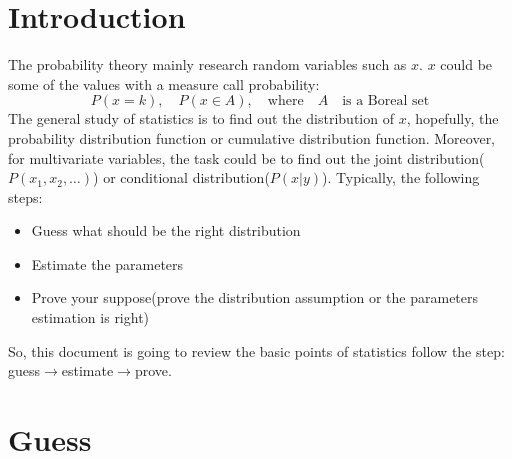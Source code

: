 \documentclass[UTF8]{article} %
\begin{document}
\section{Introduction}
The probability theory mainly research random variables such as $x$. $x$ could be some of the values with a measure call probability:
$$
P(x=k),\quad P(x \in A), \quad\text{where}\quad A \quad\text{is a Boreal set}
$$
The general study of statistics is to find out the distribution of $x$, hopefully, the probability distribution function or cumulative distribution function. Moreover, for multivariate variables, the task could be to find out the joint distribution($P(x_1,x_2,\ldots)$) or conditional distribution($P(x|y)$). Typically, the following steps:
\begin{itemize}
\item Guess what should be the right distribution
\item Estimate the parameters
\item Prove your suppose(prove the distribution assumption or the parameters estimation is right)
\end{itemize}
So, this document is going to review the basic points of statistics follow the step: guess$\rightarrow$estimate$\rightarrow$prove.

\section{Guess}
\end{document}
